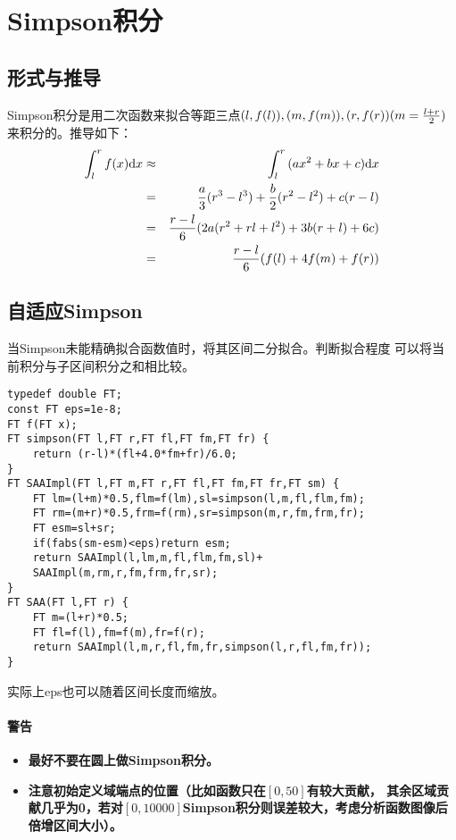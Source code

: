 \section{Simpson积分}
\subsection{形式与推导}
Simpson积分是用二次函数来拟合等距三点$(l,f(l)),(m,f(m)),(r,f(r))\\
(m=\frac{l+r}{2})$来积分的。推导如下：
\begin{eqnarray*}
    \int_l^r{f(x)\textrm{d} x}&\approx&\int_l^r{(ax^2+bx+c)\textrm{d} x}\\
    &=&\frac{a}{3}(r^3-l^3)+\frac{b}{2}(r^2-l^2)+c(r-l)\\
    &=&\frac{r-l}{6}(2a(r^2+rl+l^2)+3b(r+l)+6c)\\
    &=&\frac{r-l}{6}(f(l)+4f(m)+f(r))
\end{eqnarray*}

\subsection{自适应Simpson}
当Simpson未能精确拟合函数值时，将其区间二分拟合。判断拟合程度
可以将当前积分与子区间积分之和相比较。

\begin{lstlisting}
typedef double FT;
const FT eps=1e-8;
FT f(FT x);
FT simpson(FT l,FT r,FT fl,FT fm,FT fr) {
    return (r-l)*(fl+4.0*fm+fr)/6.0;
}
FT SAAImpl(FT l,FT m,FT r,FT fl,FT fm,FT fr,FT sm) {
    FT lm=(l+m)*0.5,flm=f(lm),sl=simpson(l,m,fl,flm,fm);
    FT rm=(m+r)*0.5,frm=f(rm),sr=simpson(m,r,fm,frm,fr);
    FT esm=sl+sr;
    if(fabs(sm-esm)<eps)return esm;
    return SAAImpl(l,lm,m,fl,flm,fm,sl)+
    SAAImpl(m,rm,r,fm,frm,fr,sr);
}
FT SAA(FT l,FT r) {
    FT m=(l+r)*0.5;
    FT fl=f(l),fm=f(m),fr=f(r);
    return SAAImpl(l,m,r,fl,fm,fr,simpson(l,r,fl,fm,fr));
}
\end{lstlisting}

实际上eps也可以随着区间长度而缩放。

\paragraph{警告}
\begin{itemize}
    \item {\bfseries 最好不要在圆上做Simpson积分。}
    \item {\bfseries 注意初始定义域端点的位置（比如函数只在$[0,50]$有较大贡献，
其余区域贡献几乎为0，若对$[0,10000]$Simpson积分则误差较大，考虑分析函数图像后
倍增区间大小）。}
\end{itemize}
